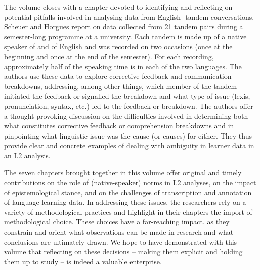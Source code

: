 \documentclass[output=paper]{../langscibook}
\begin{document}
The volume closes with a chapter devoted to identifying and reflecting on potential pitfalls involved in analysing data from English- tandem conversations. Scheuer and Horgues report on data collected from 21 tandem pairs during a semester-long programme at a  university. Each tandem is made up of a native speaker of  and of English and was recorded on two occasions (once at the beginning and once at the end of the semester). For each recording, approximately half of the speaking time is in each of the two languages. The authors use these data to explore corrective feedback and communication breakdowns, addressing, among other things, which member of the tandem initiated the feedback or signalled the breakdown and what type of issue (lexis, pronunciation, syntax, etc.) led to the feedback or breakdown. The authors offer a thought-provoking discussion on the difficulties involved in determining both what constitutes corrective feedback or comprehension breakdowns and in pinpointing what linguistic issue was the cause (or causes) for either. They thus provide clear and concrete examples of dealing with ambiguity in learner data in an L2 analysis.

The seven chapters brought together in this volume offer original and timely contributions on the role of (native-speaker) norms in L2 analyses, on the impact of epistemological stance, and on the challenges of transcription and annotation of language-learning data. In addressing these issues, the researchers rely on a variety of methodological practices and highlight in their chapters the import of methodological choice. These choices have a far-reaching impact, as they constrain and orient what observations can be made in research and what conclusions are ultimately drawn. We hope to have demonstrated with this volume that reflecting on these decisions – making them explicit and holding them up to study – is indeed a valuable enterprise. 

\sloppy\printbibliography[heading=subbibliography,notkeyword=this]
\end{document}
